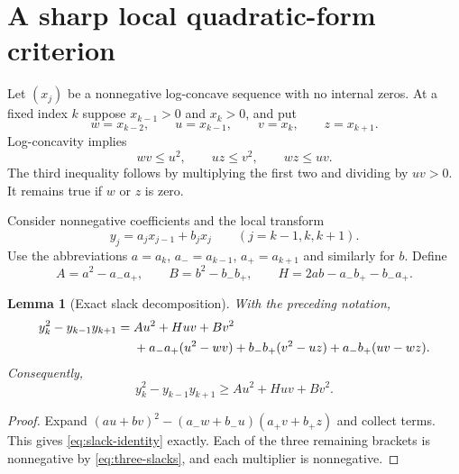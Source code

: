 \documentclass[11pt,a4paper]{article}
\numberwithin{equation}{section}
\newtheorem{lemma}[lemma]{Lemma}
\theoremstyle{definition}
\theoremstyle{remark}
\begin{document}
\section{A sharp local quadratic-form criterion}\label{sec:criterion}

Let $(x_j)$ be a nonnegative log-concave sequence with no internal zeros.
At a fixed index $k$ suppose $x_{k-1}>0$ and $x_k>0$, and put
\[
 w=x_{k-2},\qquad u=x_{k-1},\qquad v=x_k,\qquad z=x_{k+1}.
\]
Log-concavity implies
\begin{equation}\label{eq:three-slacks}
 wv\le u^2,\qquad uz\le v^2,\qquad wz\le uv.
\end{equation}
The third inequality follows by multiplying the first two and dividing by
$uv>0$. It remains true if $w$ or $z$ is zero.

Consider nonnegative coefficients and the local transform
\begin{equation}\label{eq:local-transform}
 y_j=a_jx_{j-1}+b_jx_j\qquad (j=k-1,k,k+1).
\end{equation}
Use the abbreviations $a=a_k$, $a_-=a_{k-1}$, $a_+=a_{k+1}$ and similarly
for $b$. Define
\begin{equation}\label{eq:ABH}
 A=a^2-a_-a_+,\qquad B=b^2-b_-b_+,\qquad
 H=2ab-a_-b_+-b_-a_+.
\end{equation}

\begin{lemma}[Exact slack decomposition]\label{lem:slacks}
With the preceding notation,
\begin{align}
 y_k^2-y_{k-1}y_{k+1}
  ={}& Au^2+Huv+Bv^2 \notag\\
    &+a_-a_+(u^2-wv)+b_-b_+(v^2-uz)
       +a_-b_+(uv-wz).\label{eq:slack-identity}
\end{align}
Consequently,
\begin{equation}\label{eq:quadratic-bound}
 y_k^2-y_{k-1}y_{k+1}\ge Au^2+Huv+Bv^2.
\end{equation}
\end{lemma}
\begin{proof}
Expand $(au+bv)^2-(a_-w+b_-u)(a_+v+b_+z)$ and collect terms.
This gives \eqref{eq:slack-identity} exactly. Each of the three remaining
brackets is nonnegative by \eqref{eq:three-slacks}, and each multiplier
is nonnegative.
\end{proof}
\end{document}
